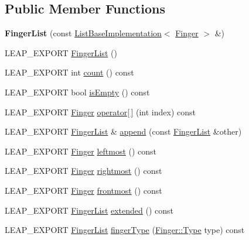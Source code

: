 \subsection*{Public Member Functions}
\begin{DoxyCompactItemize}
\item 
\mbox{\label{class_leap_1_1_finger_list_a730629d5b27f07888ddb574bf06a85ef}} 
{\bfseries Finger\+List} (const \hyperlink{class_leap_1_1_list_base_implementation}{List\+Base\+Implementation}$<$ \hyperlink{class_leap_1_1_finger}{Finger} $>$ \&)
\item 
L\+E\+A\+P\+\_\+\+E\+X\+P\+O\+RT \hyperlink{class_leap_1_1_finger_list_aa04009715ecbb8b2417a1459ed3bb7fd}{Finger\+List} ()
\item 
L\+E\+A\+P\+\_\+\+E\+X\+P\+O\+RT int \hyperlink{class_leap_1_1_finger_list_a5a542e9e6c894f1856997f0fb605e8b7}{count} () const
\item 
L\+E\+A\+P\+\_\+\+E\+X\+P\+O\+RT bool \hyperlink{class_leap_1_1_finger_list_ae1c9c29066daa1e98cc9947799da3802}{is\+Empty} () const
\item 
L\+E\+A\+P\+\_\+\+E\+X\+P\+O\+RT \hyperlink{class_leap_1_1_finger}{Finger} \hyperlink{class_leap_1_1_finger_list_a64a8580ef7401081c1d18f11cd285764}{operator\mbox{[}$\,$\mbox{]}} (int index) const
\item 
L\+E\+A\+P\+\_\+\+E\+X\+P\+O\+RT \hyperlink{class_leap_1_1_finger_list}{Finger\+List} \& \hyperlink{class_leap_1_1_finger_list_ab032377473c269651a1110f3a5de3263}{append} (const \hyperlink{class_leap_1_1_finger_list}{Finger\+List} \&other)
\item 
L\+E\+A\+P\+\_\+\+E\+X\+P\+O\+RT \hyperlink{class_leap_1_1_finger}{Finger} \hyperlink{class_leap_1_1_finger_list_ace261bf243a6655c1402ddb3f8f97494}{leftmost} () const
\item 
L\+E\+A\+P\+\_\+\+E\+X\+P\+O\+RT \hyperlink{class_leap_1_1_finger}{Finger} \hyperlink{class_leap_1_1_finger_list_acb8b16de09fd0751d395ce7580fc28ff}{rightmost} () const
\item 
L\+E\+A\+P\+\_\+\+E\+X\+P\+O\+RT \hyperlink{class_leap_1_1_finger}{Finger} \hyperlink{class_leap_1_1_finger_list_ac3f85628d7815422b6b61c3d5d61fe4a}{frontmost} () const
\item 
L\+E\+A\+P\+\_\+\+E\+X\+P\+O\+RT \hyperlink{class_leap_1_1_finger_list}{Finger\+List} \hyperlink{class_leap_1_1_finger_list_a32fb005494e5a3a433de76992ac07895}{extended} () const
\item 
L\+E\+A\+P\+\_\+\+E\+X\+P\+O\+RT \hyperlink{class_leap_1_1_finger_list}{Finger\+List} \hyperlink{class_leap_1_1_finger_list_a2fbb5276be9f22c9f35589b0a0b5d8eb}{finger\+Type} (\hyperlink{class_leap_1_1_finger_a1e94681e6d2168b2f854fcad7c8ac483}{Finger\+::\+Type} type) const

\end{DoxyCompactItemize}
